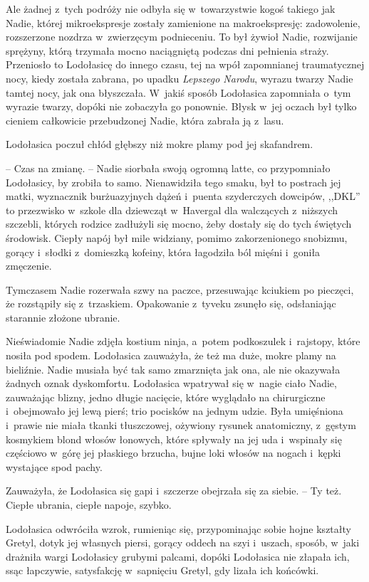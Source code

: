\documentclass[oneside,polish,11pt,sfheadings]{mwbk}
\begin{document}
Ale żadnej z~tych podróży nie odbyła się w~towarzystwie kogoś takiego
jak Nadie, której mikroekspresje zostały zamienione na makroekspresję:
zadowolenie, rozszerzone nozdrza w~zwierzęcym podnieceniu. To był żywioł
Nadie, rozwijanie sprężyny, którą trzymała mocno naciągniętą podczas dni
pełnienia straży. Przeniosło to Lodołasicę do innego czasu, tej na wpół
zapomnianej traumatycznej nocy, kiedy została zabrana, po upadku
\textit{Lepszego Narodu}, wyrazu twarzy Nadie tamtej nocy, jak ona
błyszczała. W~jakiś sposób Lodołasica zapomniała o~tym wyrazie twarzy,
dopóki nie zobaczyła go ponownie. Błysk w~jej oczach był tylko cieniem
całkowicie przebudzonej Nadie, która zabrała ją z~lasu.

Lodołasica poczuł chłód głębszy niż mokre plamy pod jej skafandrem.

-- Czas na zmianę. -- Nadie siorbała swoją ogromną latte, co przypomniało
Lodołasicy, by zrobiła to samo. Nienawidziła tego smaku, był to postrach
jej matki, wyznacznik burżuazyjnych dążeń i~puenta szyderczych dowcipów,
,,DKL'' to przezwisko w~szkole dla dziewcząt w~Havergal dla walczących z~niższych szczebli, których rodzice zadłużyli się mocno, żeby dostały się
do tych świętych środowisk. Ciepły napój był mile widziany, pomimo
zakorzenionego snobizmu, gorący i~słodki z~domieszką kofeiny, która
łagodziła ból mięśni i~goniła zmęczenie.

Tymczasem Nadie rozerwała szwy na paczce, przesuwając kciukiem po
pieczęci, że rozstąpiły się z~trzaskiem. Opakowanie z~tyveku zsunęło
się, odsłaniając starannie złożone ubranie.

Nieświadomie Nadie zdjęła kostium ninja, a~potem podkoszulek i~rajstopy,
które nosiła pod spodem. Lodołasica zauważyła, że też ma duże, mokre
plamy na bieliźnie. Nadie musiała być tak samo zmarznięta jak ona, ale
nie okazywała żadnych oznak dyskomfortu. Lodołasica wpatrywał się w~nagie ciało Nadie, zauważając blizny, jedno długie nacięcie, które
wyglądało na chirurgiczne i~obejmowało jej lewą pierś; trio pocisków na
jednym udzie. Była umięśniona i~prawie nie miała tkanki tłuszczowej,
ożywiony rysunek anatomiczny, z~gęstym kosmykiem blond włosów łonowych,
które spływały na jej uda i~wspinały się częściowo w~górę jej płaskiego
brzucha, bujne loki włosów na nogach i~kępki wystające spod pachy.

Zauważyła, że Lodołasica się gapi i~szczerze obejrzała się za siebie. -- Ty też. Ciepłe ubrania, ciepłe napoje, szybko.

Lodołasica odwróciła wzrok, rumieniąc się, przypominając sobie hojne
kształty Gretyl, dotyk jej własnych piersi, gorący oddech na szyi i~uszach, sposób, w~jaki drażniła wargi Lodołasicy grubymi palcami, dopóki
Lodołasica nie złapała ich, ssąc łapczywie, satysfakcję w~sapnięciu
Gretyl, gdy lizała ich końcówki.
\end{document}
